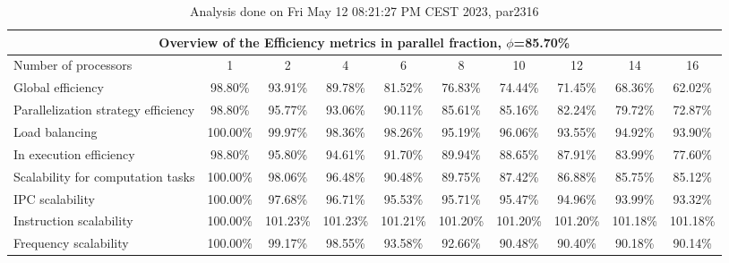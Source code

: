 \begin{table}[h]
\begin{center}
\begin{tabular}{|l|c|c|c|c|c|c|c|c|c|}
\hline
\multicolumn{10}{|c|}{Overview of the Efficiency metrics in parallel fraction, $\phi$=85.70\%} \\
\hline
\hline
Number of processors & 1 & 2 & 4 & 6 & 8 & 10 & 12 & 14 & 16 \\
\hline
\hline
Global efficiency                      &     98.80\% &     93.91\% &     89.78\% &     81.52\% &     76.83\% &     74.44\% &     71.45\% &     68.36\% &     62.02\% \\
\hline
\hline
Parallelization strategy efficiency &     98.80\% &     95.77\% &     93.06\% &     90.11\% &     85.61\% &     85.16\% &     82.24\% &     79.72\% &     72.87\% \\
\hline
Load balancing                   &    100.00\% &     99.97\% &     98.36\% &     98.26\% &     95.19\% &     96.06\% &     93.55\% &     94.92\% &     93.90\% \\
In execution efficiency          &     98.80\% &     95.80\% &     94.61\% &     91.70\% &     89.94\% &     88.65\% &     87.91\% &     83.99\% &     77.60\% \\
\hline
\hline
Scalability for computation tasks   &    100.00\% &     98.06\% &     96.48\% &     90.48\% &     89.75\% &     87.42\% &     86.88\% &     85.75\% &     85.12\% \\
\hline
IPC scalability                  &    100.00\% &     97.68\% &     96.71\% &     95.53\% &     95.71\% &     95.47\% &     94.96\% &     93.99\% &     93.32\% \\
Instruction scalability          &    100.00\% &    101.23\% &    101.23\% &    101.21\% &    101.20\% &    101.20\% &    101.20\% &    101.18\% &    101.18\% \\
Frequency scalability            &    100.00\% &     99.17\% &     98.55\% &     93.58\% &     92.66\% &     90.48\% &     90.40\% &     90.18\% &     90.14\% \\
\hline
\end{tabular}
\end{center}
\caption{ Analysis done on Fri May 12 08:21:27 PM CEST 2023, par2316}
\end{table}
